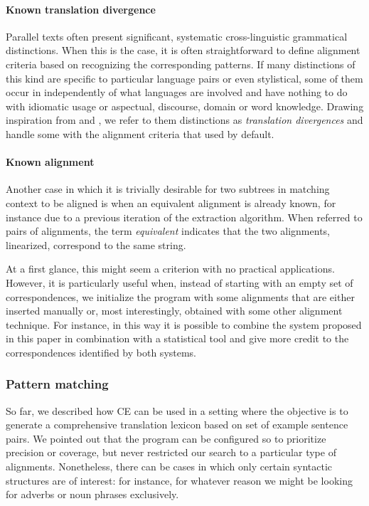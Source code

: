 \documentclass[11pt]{article}
\begin{document}
\paragraph{Known translation divergence}
Parallel texts often present significant, systematic cross-linguistic grammatical distinctions. 
When this is the case, it is often straightforward to define alignment criteria based on recognizing the corresponding patterns.
If many distinctions of this kind are specific to particular language pairs or even stylistical, some of them occur in independently of what languages are involved and have nothing to do with idiomatic usage or aspectual, discourse, domain or word knowledge. Drawing inspiration from \cite{TODO:} and \cite{TODO:}, we refer to them distinctions as \textit{translation divergences} and handle some with the alignment criteria that used by default.


\paragraph{Known alignment} \label{ka}
Another case in which it is trivially desirable for two subtrees in matching context to be aligned is when an equivalent alignment is already known, for instance due to a previous iteration of the extraction algorithm. 
When referred to pairs of alignments, the term \textit{equivalent} indicates that the two alignments, linearized, correspond to the same string.

At a first glance, this might seem a criterion with no practical applications. 
However, it is particularly useful when, instead of starting with an empty set of correspondences, we initialize the program with some alignments that are either inserted manually or, most interestingly, obtained with some other alignment technique. 
For instance, in this way it is possible to combine the system proposed in this paper in combination with a statistical tool and give more credit to the correspondences identified by both systems.

\subsubsection{Pattern matching}
So far, we described how CE can be used in a setting where the objective is to generate a comprehensive translation lexicon based on set of example sentence pairs.
We pointed out that the program can be configured so to prioritize precision or coverage, but never restricted our search to a particular type of alignments.
Nonetheless, there can be cases in which only certain syntactic structures are of interest: for instance, for whatever reason we might be looking for adverbs or noun phrases exclusively.
\end{document}
